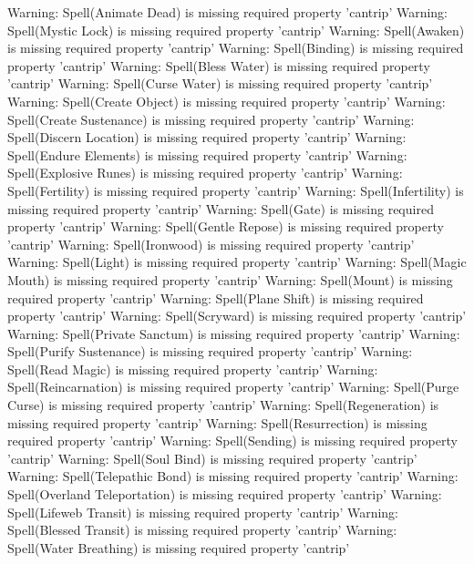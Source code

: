 Warning: Spell(Animate Dead) is missing required property 'cantrip'
Warning: Spell(Mystic Lock) is missing required property 'cantrip'
Warning: Spell(Awaken) is missing required property 'cantrip'
Warning: Spell(Binding) is missing required property 'cantrip'
Warning: Spell(Bless Water) is missing required property 'cantrip'
Warning: Spell(Curse Water) is missing required property 'cantrip'
Warning: Spell(Create Object) is missing required property 'cantrip'
Warning: Spell(Create Sustenance) is missing required property 'cantrip'
Warning: Spell(Discern Location) is missing required property 'cantrip'
Warning: Spell(Endure Elements) is missing required property 'cantrip'
Warning: Spell(Explosive Runes) is missing required property 'cantrip'
Warning: Spell(Fertility) is missing required property 'cantrip'
Warning: Spell(Infertility) is missing required property 'cantrip'
Warning: Spell(Gate) is missing required property 'cantrip'
Warning: Spell(Gentle Repose) is missing required property 'cantrip'
Warning: Spell(Ironwood) is missing required property 'cantrip'
Warning: Spell(Light) is missing required property 'cantrip'
Warning: Spell(Magic Mouth) is missing required property 'cantrip'
Warning: Spell(Mount) is missing required property 'cantrip'
Warning: Spell(Plane Shift) is missing required property 'cantrip'
Warning: Spell(Scryward) is missing required property 'cantrip'
Warning: Spell(Private Sanctum) is missing required property 'cantrip'
Warning: Spell(Purify Sustenance) is missing required property 'cantrip'
Warning: Spell(Read Magic) is missing required property 'cantrip'
Warning: Spell(Reincarnation) is missing required property 'cantrip'
Warning: Spell(Purge Curse) is missing required property 'cantrip'
Warning: Spell(Regeneration) is missing required property 'cantrip'
Warning: Spell(Resurrection) is missing required property 'cantrip'
Warning: Spell(Sending) is missing required property 'cantrip'
Warning: Spell(Soul Bind) is missing required property 'cantrip'
Warning: Spell(Telepathic Bond) is missing required property 'cantrip'
Warning: Spell(Overland Teleportation) is missing required property 'cantrip'
Warning: Spell(Lifeweb Transit) is missing required property 'cantrip'
Warning: Spell(Blessed Transit) is missing required property 'cantrip'
Warning: Spell(Water Breathing) is missing required property 'cantrip'
